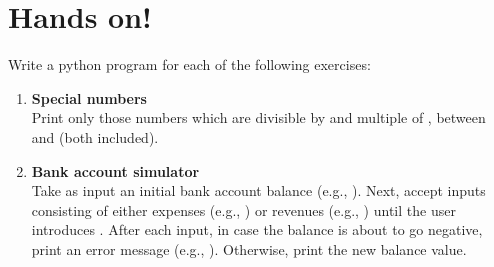 \documentclass[aspectratio=1610,t]{beamer}
\begin{document}
\section{Hands on!}
\begin{pframe}
 \vspace{-0.5cm}
 Write a python program for each of the following exercises:
\begin{enumerate}
  \item \textbf{Special numbers} \\
        Print only those numbers which are divisible by  and multiple of
        , between  and  (both included).
  \item \textbf{Bank account simulator} \\
        Take as input an initial bank account balance (e.g., ). Next,
        accept inputs consisting of either expenses (e.g., ) or
        revenues (e.g., ) until the user introduces .
        After each input, in case the balance is about to go negative, print an
        error message (e.g., ). Otherwise, print the new balance value.
 \end{enumerate}
\end{pframe}
\end{document}
